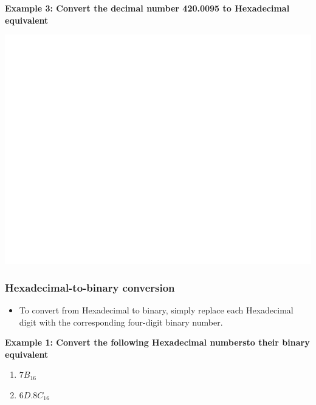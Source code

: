 \documentclass[]{book}
\providecommand{\tightlist}{%
  \setlength{\itemsep}{0pt}\setlength{\parskip}{0pt}}
\begin{document}
\textbf{Example 3: Convert the decimal number 420.0095 to Hexadecimal equivalent}

\begin{center}\includegraphics[width=1\linewidth]{figure/NSbox17-1} \end{center}

\hypertarget{hexadecimal-to-binary-conversion}{%
\subsubsection{Hexadecimal-to-binary conversion}\label{hexadecimal-to-binary-conversion}}

\begin{itemize}
\tightlist
\item
  To convert from Hexadecimal to binary, simply replace each Hexadecimal digit with the corresponding four-digit binary number.
\end{itemize}

\textbf{Example 1: Convert the following Hexadecimal numbersto their binary equivalent}

\begin{enumerate}
\def\labelenumi{(\alph{enumi})}
\tightlist
\item
  \(7B_{16}\)
\item
  \(6D.8C_{16}\)
\end{enumerate}
\end{document}
